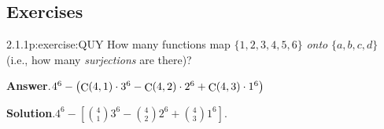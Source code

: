 \documentclass[twoside,11pt,]{book}
\newcommand{\blocktitlefont}{\relax}
\numberwithin{equation}{chapter}
\begin{document}
\subsection*{Exercises}
\begin{divisionsolution}{2.1.1}{}{p:exercise:QUY}%
How many functions map \(\{1,2,3,4,5,6\}\) \emph{onto} \(\{a,b,c,d\}\) (i.e., how many \emph{surjections} are there)?%
\par\smallskip%
\noindent\textbf{\blocktitlefont Answer}.\quad{}\(4^{6}-\left(\mathop{\rm C}\nolimits\!\left(4,1\right)\cdot 3^{6}-\mathop{\rm C}\nolimits\!\left(4,2\right)\cdot 2^{6}+\mathop{\rm C}\nolimits\!\left(4,3\right)\cdot 1^{6}\right)\)%
\par\smallskip%
\noindent\textbf{\blocktitlefont Solution}.\quad{}\(4^6 - \left[{4 \choose 1}3^6 - {4 \choose 2}2^6 + {4 \choose 3} 1^6 \right]\text{.}\)%
\end{divisionsolution}%
\end{document}

